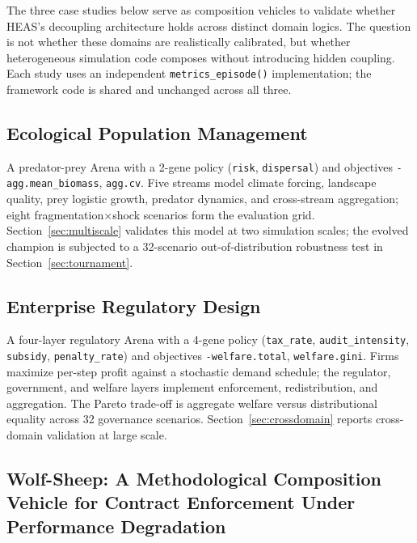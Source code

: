 \documentclass{wscpaperproc}
\begin{document}
The three case studies below serve as composition vehicles to validate whether HEAS's decoupling architecture holds across distinct domain logics. The question is not whether these domains are realistically calibrated, but whether heterogeneous simulation code composes without introducing hidden coupling. Each study uses an independent \texttt{metrics\_episode()} implementation; the framework code is shared and unchanged across all three.

\subsection{Ecological Population Management}

A predator-prey Arena with a 2-gene policy (\texttt{risk},
\texttt{dispersal}) and objectives \texttt{-agg.mean\_biomass},
\texttt{agg.cv}. Five streams model climate forcing, landscape quality, prey
logistic growth, predator dynamics, and cross-stream aggregation; eight
fragmentation$\times$shock scenarios form the evaluation grid.
Section~\ref{sec:multiscale} validates this model at two simulation scales; the evolved champion
is subjected to a 32-scenario out-of-distribution robustness test in
Section~\ref{sec:tournament}.

\subsection{Enterprise Regulatory Design}

A four-layer regulatory Arena with a 4-gene policy
(\texttt{tax\_rate}, \texttt{audit\_intensity}, \texttt{subsidy},
\texttt{penalty\_rate}) and objectives \texttt{-welfare.total},
\texttt{welfare.gini}. Firms maximize per-step profit against a stochastic
demand schedule; the regulator, government, and welfare layers implement
enforcement, redistribution, and aggregation. The Pareto trade-off is
aggregate welfare versus distributional equality across 32 governance scenarios.
Section~\ref{sec:crossdomain} reports cross-domain validation at large scale.

\subsection{Wolf-Sheep: A Methodological Composition Vehicle for Contract Enforcement Under Performance Degradation}
\label{sec:wolfsheep}
\end{document}
